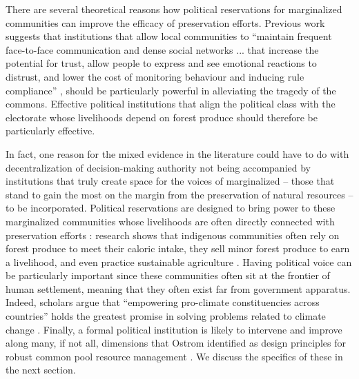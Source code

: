 \documentclass[12pt,reqno]{article}
\begin{document}
There are several theoretical reasons how political reservations for marginalized communities can improve the efficacy of preservation efforts. Previous work suggests that institutions that allow local communities to ``maintain frequent face-to-face communication and dense social networks ... that increase the potential for trust, allow people to express and see emotional reactions to distrust, and lower the cost of monitoring behaviour and inducing rule compliance'' \parencite{Dietz2003-bs}, should be particularly powerful in alleviating the tragedy of the commons. Effective political institutions that align the political class with the electorate whose livelihoods depend on forest produce should therefore be particularly effective. 

In fact, one reason for the mixed evidence in the literature could have to do with decentralization of decision-making authority not being accompanied by institutions that truly create space for the voices of marginalized -- those that stand to gain the most on the margin from the preservation of natural resources -- to be incorporated. Political reservations are designed to bring power to these marginalized communities whose livelihoods are often directly connected with preservation efforts \parencite{zimmerman2001conservation}: research shows that indigenous communities often rely on forest produce to meet their caloric intake, they sell minor forest produce to earn a livelihood, and even practice sustainable agriculture \parencite{kashwan2017democracy}. Having political voice can be particularly important since these communities often sit at the frontier of human settlement, meaning that they often exist far from government apparatus. Indeed, scholars argue that ``empowering pro-climate constituencies across countries'' holds the greatest promise in solving problems related to climate change \parencite{aklin2018prisoners}. Finally, a formal political institution is likely to intervene and improve along many, if not all, dimensions that Ostrom identified as design principles for robust common pool resource management \parencite[p. 90]{ostrom1990governing}. We discuss the specifics of these in the next section.






\end{document}
